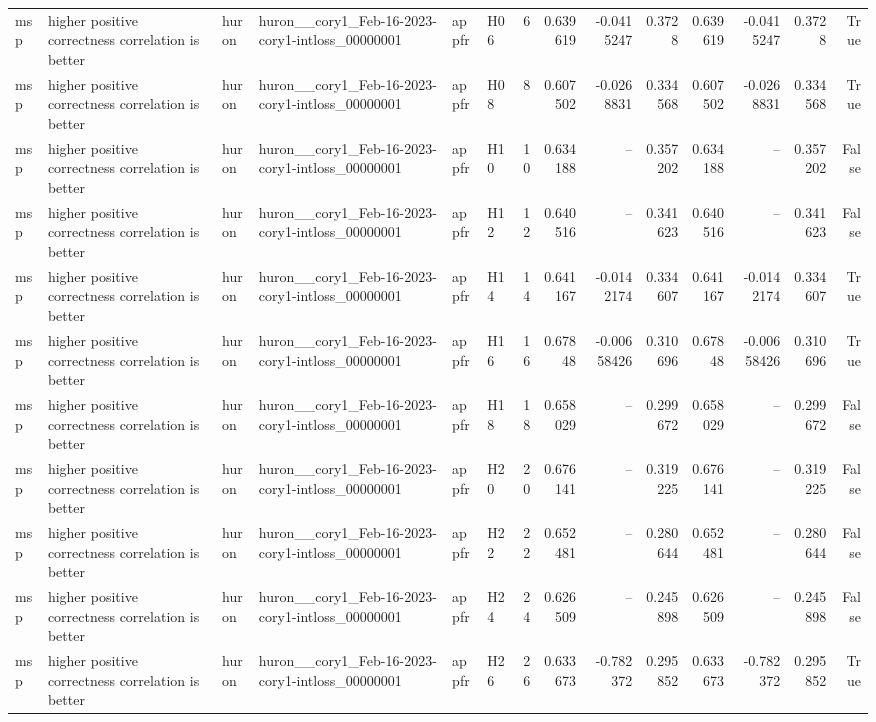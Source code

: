 \begin{longtable}{llllllrrrrrrrr}
msp & higher positive correctness correlation is better & huron & huron\_\_cory1\_Feb-16-2023-cory1-intloss\_00000001 & appfr & H06 & 6 & 0.639619 & -0.0415247 & 0.3728 & 0.639619 & -0.0415247 & 0.3728 & True \\
msp & higher positive correctness correlation is better & huron & huron\_\_cory1\_Feb-16-2023-cory1-intloss\_00000001 & appfr & H08 & 8 & 0.607502 & -0.0268831 & 0.334568 & 0.607502 & -0.0268831 & 0.334568 & True \\
msp & higher positive correctness correlation is better & huron & huron\_\_cory1\_Feb-16-2023-cory1-intloss\_00000001 & appfr & H10 & 10 & 0.634188 & -- & 0.357202 & 0.634188 & -- & 0.357202 & False \\
msp & higher positive correctness correlation is better & huron & huron\_\_cory1\_Feb-16-2023-cory1-intloss\_00000001 & appfr & H12 & 12 & 0.640516 & -- & 0.341623 & 0.640516 & -- & 0.341623 & False \\
msp & higher positive correctness correlation is better & huron & huron\_\_cory1\_Feb-16-2023-cory1-intloss\_00000001 & appfr & H14 & 14 & 0.641167 & -0.0142174 & 0.334607 & 0.641167 & -0.0142174 & 0.334607 & True \\
msp & higher positive correctness correlation is better & huron & huron\_\_cory1\_Feb-16-2023-cory1-intloss\_00000001 & appfr & H16 & 16 & 0.67848 & -0.00658426 & 0.310696 & 0.67848 & -0.00658426 & 0.310696 & True \\
msp & higher positive correctness correlation is better & huron & huron\_\_cory1\_Feb-16-2023-cory1-intloss\_00000001 & appfr & H18 & 18 & 0.658029 & -- & 0.299672 & 0.658029 & -- & 0.299672 & False \\
msp & higher positive correctness correlation is better & huron & huron\_\_cory1\_Feb-16-2023-cory1-intloss\_00000001 & appfr & H20 & 20 & 0.676141 & -- & 0.319225 & 0.676141 & -- & 0.319225 & False \\
msp & higher positive correctness correlation is better & huron & huron\_\_cory1\_Feb-16-2023-cory1-intloss\_00000001 & appfr & H22 & 22 & 0.652481 & -- & 0.280644 & 0.652481 & -- & 0.280644 & False \\
msp & higher positive correctness correlation is better & huron & huron\_\_cory1\_Feb-16-2023-cory1-intloss\_00000001 & appfr & H24 & 24 & 0.626509 & -- & 0.245898 & 0.626509 & -- & 0.245898 & False \\
msp & higher positive correctness correlation is better & huron & huron\_\_cory1\_Feb-16-2023-cory1-intloss\_00000001 & appfr & H26 & 26 & 0.633673 & -0.782372 & 0.295852 & 0.633673 & -0.782372 & 0.295852 & True \\

\end{longtable}
